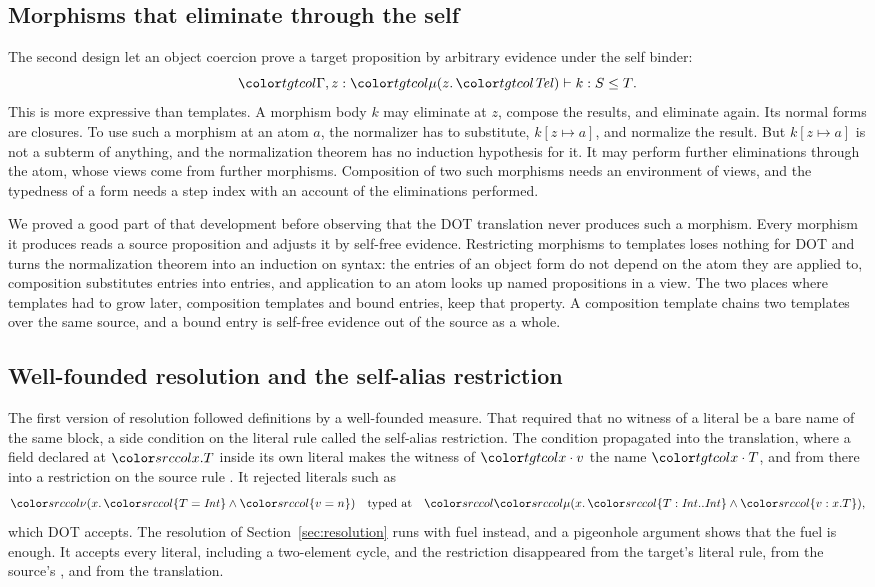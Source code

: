 \subsection{Morphisms that eliminate through the self}\label{sec:why-structural}

The second design let an object coercion prove a target proposition by arbitrary evidence under the self binder:
\[
\tgt{\Gamma, z : \obj[z]{\tel} \vdash k : S \le T} .
\]
This is more expressive than templates. A morphism body $k$ may eliminate at $z$, compose the results, and eliminate again. Its normal forms are closures. To use such a morphism at an atom $a$, the normalizer has to substitute, $k[z \mapsto a]$, and normalize the result. But $k[z \mapsto a]$ is not a subterm of anything, and the normalization theorem has no induction hypothesis for it. It may perform further eliminations through the atom, whose views come from further morphisms. Composition of two such morphisms needs an environment of views, and the typedness of a form needs a step index with an account of the eliminations performed.

We proved a good part of that development before observing that the DOT translation never produces such a morphism. Every morphism it produces reads a source proposition and adjusts it by self-free evidence. Restricting morphisms to templates loses nothing for DOT and turns the normalization theorem into an induction on syntax: the entries of an object form do not depend on the atom they are applied to, composition substitutes entries into entries, and application to an atom looks up named propositions in a view. The two places where templates had to grow later, composition templates and bound entries, keep that property. A composition template chains two templates over the same source, and a bound entry is self-free evidence out of the source as a whole.

\subsection{Well-founded resolution and the self-alias restriction}

The first version of resolution followed definitions by a well-founded measure. That required that no witness of a literal be a bare name of the same block, a side condition on the literal rule called the self-alias restriction. The condition propagated into the translation, where a field declared at $\dsel{x}{T}$ inside its own literal makes the witness of $\sel{x}{v}$ the name $\sel{x}{T}$, and from there into a restriction on the source rule . It rejected literals such as
\[
\src{\nu(x.\,\ddeftyp{T}{\mathit{Int}} \wedge \ddeftrm{v}{n})} \quad\text{typed at}\quad \src{\dmu{x}{\dtyp{T}{\mathit{Int}}{\mathit{Int}} \wedge \dfld{v}{x.T}}} ,
\]
which DOT accepts. The resolution of Section~\ref{sec:resolution} runs with fuel instead, and a pigeonhole argument shows that the fuel is enough. It accepts every literal, including a two-element cycle, and the restriction disappeared from the target's literal rule, from the source's , and from the translation.

